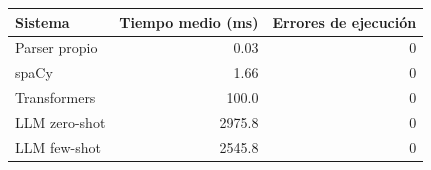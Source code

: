 \begin{tabular}{lrr}
\toprule
Sistema & Tiempo medio (ms) & Errores de ejecución \\
\midrule
Parser propio & 0.03 & 0 \\
spaCy & 1.66 & 0 \\
Transformers & 100.0 & 0 \\
LLM zero-shot & 2975.8 & 0 \\
LLM few-shot & 2545.8 & 0 \\
\bottomrule
\end{tabular}
